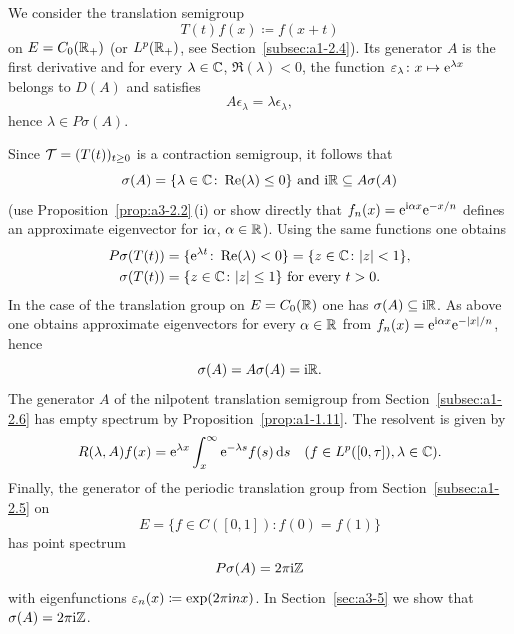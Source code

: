 \begin{example}\label{ex:a3-2.4}

We consider the translation semigroup
\[
T(t)f(x) \coloneq f(x+t)
\]
on $E = C_{0}(\mathbb{R}_{+})$ (or $L^{p}(\mathbb{R}_{+})$, see Section~\ref{subsec:a1-2.4}).
Its generator $A$ is the first derivative and for every $\lambda \in \mathbb{C}$, $\Re(\lambda) < 0$, the function $\epsilon_{\lambda} \colon x \mapsto \eu^{\lambda x}$ belongs to $D(A)$ and satisfies
\[
A\epsilon_{\lambda} = \lambda\epsilon_{\lambda} ,
\]
hence $\lambda \in P\sigma(A)$.

Since $\TT = (T(t))_{t \geq 0}$ is a contraction semigroup, it follows that 
%
\[
	 \text{$\sigma(A) = \{\lambda \in \C \colon \Re(\lambda) \leq 0\}$  and $\im\R \subseteq A\sigma(A)$}  
\]
%
(use Proposition~\ref{prop:a3-2.2}\,(i) or show directly that $f_{n}(x) = \mathrm{e}^{ \mathrm{i}\alpha x}\mathrm{e}^{-x/n}$ defines an approximate eigenvector for $\mathrm{i}\alpha$, $\alpha \in \mathbb{R}$).
Using the same functions one obtains
\begin{align*}
	P\sigma(T(t)) &= \{\eu^{\lambda t} \colon \Re(\lambda) < 0\} = \{z \in \C \colon |z| < 1\} ,\\
	\sigma(T(t)) &= \{z \in \C \colon |z| \leq 1\} \text{ for every } t > 0 .
\end{align*}
In the case of the translation group on $E = C_{0}(\mathbb{R})$ one has $\sigma(A) \subseteq \mathrm{i}\mathbb{R}$.
As above one obtains approximate eigenvectors for every $\alpha \in \mathbb{R}$ from 
$f_{n}(x) = \mathrm{e}^{\mathrm{i}\alpha x}\mathrm{e}^{-|x|/n}$, hence
\[
\sigma(A) = A\sigma(A) = \mathrm{i}\mathbb{R} .
\]
The generator $A$ of the nilpotent translation semigroup from Section~\ref{subsec:a1-2.6} has empty spectrum by Proposition~\ref{prop:a1-1.11}.
The resolvent is given by
\[
R(\lambda,A)f(x) = \mathrm{e}^{\lambda x}\int_{x}^{\infty}\mathrm{e}^{-\lambda s}f(s)  \mathop{}\!\mathrm{d}{s} \quad (f \in L^{p}([0,\tau]), \lambda \in \mathbb{C}) .
\]
Finally, the generator of the periodic translation group from Section~\ref{subsec:a1-2.5} on
\[
	E = \{f \in C([0,1]) \colon f(0) = f(1)\}
\]
%
has point spectrum
\[
P\sigma(A) = 2\pi \mathrm{i}\mathbb{Z}
\]
with eigenfunctions $\epsilon_{n}(x) \coloneq \exp(2\pi \im n x)$.
In Section~\ref{sec:a3-5} we show that $\sigma(A) = 2\pi \mathrm{i}\mathbb{Z}$.
\end{example}
